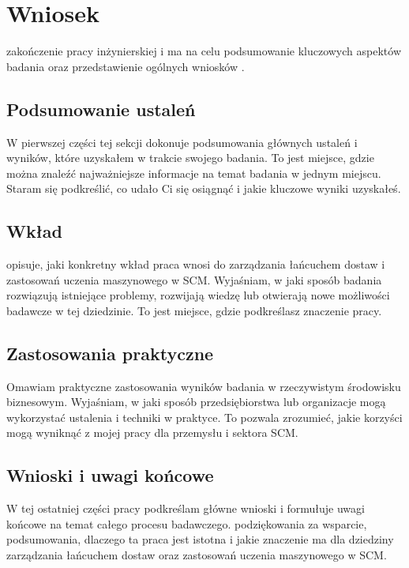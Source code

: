\newpage %
\section{Wniosek}
zakończenie pracy inżynierskiej i ma na celu podsumowanie kluczowych aspektów badania oraz przedstawienie ogólnych wniosków .

\subsection{Podsumowanie ustaleń}
W pierwszej części tej sekcji dokonuje podsumowania głównych ustaleń i wyników, które uzyskałem w trakcie swojego badania. To jest miejsce, gdzie można znaleźć najważniejsze informacje na temat  badania w jednym miejscu. Staram się podkreślić, co udało Ci się osiągnąć i jakie kluczowe wyniki uzyskałeś.

\subsection{Wkład}
 opisuje, jaki konkretny wkład praca wnosi do zarządzania łańcuchem dostaw i zastosowań uczenia maszynowego w SCM. Wyjaśniam, w jaki sposób badania rozwiązują istniejące problemy, rozwijają wiedzę lub otwierają nowe możliwości badawcze w tej dziedzinie. To jest miejsce, gdzie podkreślasz znaczenie pracy.

\subsection{Zastosowania praktyczne}
Omawiam praktyczne zastosowania wyników  badania w rzeczywistym środowisku biznesowym. Wyjaśniam, w jaki sposób przedsiębiorstwa lub organizacje mogą wykorzystać  ustalenia i techniki w praktyce. To pozwala  zrozumieć, jakie korzyści mogą wyniknąć z mojej pracy dla przemysłu i sektora SCM.

\subsection{Wnioski i uwagi końcowe}
W tej ostatniej części pracy podkreślam główne wnioski i formułuje uwagi końcowe na temat całego procesu badawczego. podziękowania za wsparcie, podsumowania, dlaczego ta praca jest istotna i jakie znaczenie ma dla dziedziny zarządzania łańcuchem dostaw oraz zastosowań uczenia maszynowego w SCM.